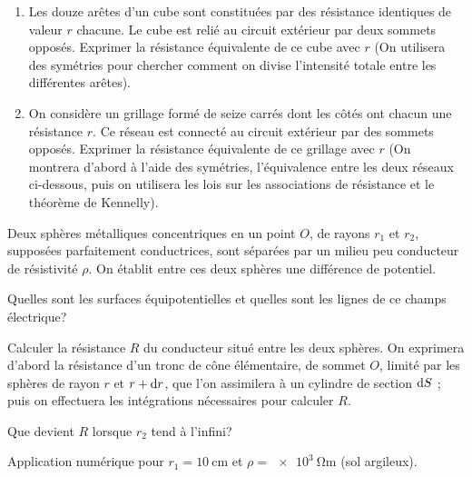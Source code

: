 \begin{exercice}%
  \begin{enumerate}
    \item Les douze arêtes d'un cube sont constituées par des résistance 
      identiques de valeur \(r\) chacune. Le cube est relié au circuit 
      extérieur par deux sommets opposés. Exprimer la résistance équivalente de 
      ce cube avec \(r\) (On utilisera des symétries pour chercher comment on 
      divise l'intensité totale entre les différentes arêtes).
    \item On considère un grillage formé de seize carrés dont les côtés ont 
      chacun une résistance \(r\). Ce réseau est connecté au circuit extérieur 
      par des sommets opposés. Exprimer la résistance équivalente de ce 
      grillage avec \(r\) (On montrera d'abord à l'aide des symétries, 
      l’équivalence entre les deux réseaux ci-dessous, puis on utilisera les 
      lois sur les associations de résistance et le théorème de Kennelly).
  \end{enumerate}
\end{exercice}%

\begin{exercice}%
  Deux sphères métalliques concentriques en un point \(O\), de rayons \(r_1\) 
  et \(r_2\), supposées parfaitement conductrices, sont séparées par un milieu 
  peu conducteur de résistivité \(\rho\). On établit entre ces deux sphères une 
  différence de potentiel.

  Quelles sont les surfaces équipotentielles et quelles sont les lignes de ce 
  champs électrique?

  Calculer la résistance \(R\) du conducteur situé entre les deux sphères. On 
  exprimera d'abord la résistance d'un tronc de cône élémentaire, de sommet 
  \(O\), limité par les sphères de rayon \(r\) et \(r +\mathrm{d} r\), que l'on 
  assimilera à un cylindre de section \(\mathrm{d} S\) ; puis on effectuera les 
  intégrations nécessaires pour calculer \(R\).

  Que devient \(R\) lorsque \(r_2\) tend à l'infini?

  Application numérique pour \(r_1 = \SI{10}{\centi\meter}\) et 
  \(\rho=\SI{e3}{\ohm \meter}\) (sol argileux).
\end{exercice}%

